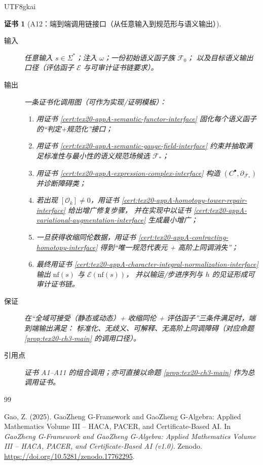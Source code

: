 \documentclass[12pt]{article}
\newtheorem{Certificate}{证书}[section]
\begin{document}
\begin{CJK*}{UTF8}{gkai}
\begin{Certificate}[A12：端到端调用链接口（从任意输入到规范形与语义输出）]
\label{cert:tex20-appA-endtoend-callgraph}
\begin{description}
  \item[输入] 任意输入 $s\in\Sigma^\ast$；注入 $\omega$；一份初始语义函子族 $\mathcal{F}_0$；
  以及目标语义输出口径（评估函子 $\mathcal{E}$ 与可审计证书链要求）。
  \item[输出] 一条证书化调用图（可作为实现/证明模板）：
  \begin{enumerate}
    \item 用证书 \ref{cert:tex20-appA-semantic-functor-interface} 固化每个语义函子的“判定+规范化”接口；
    \item 用证书 \ref{cert:tex20-appA-semantic-gauge-field-interface} 约束并抽取满足标准性与最小性的语义规范场候选 $\mathcal{F}_\ast$；
    \item 用证书 \ref{cert:tex20-appA-expression-complex-interface} 构造 $(C^\bullet,\partial_{\mathcal{F}_\ast})$ 并诊断障碍类；
    \item 若出现 $[\mathcal{O}_k]\neq 0$，用证书 \ref{cert:tex20-appA-homotopy-tower-repair-interface} 给出增广修复步骤，
    并在实现中以证书 \ref{cert:tex20-appA-variational-augmentation-interface} 生成最小增广；
    \item 一旦获得收缩同伦数据，用证书 \ref{cert:tex20-appA-contracting-homotopy-interface} 得到“唯一规范代表元 + 高阶上同调消失”；
    \item 最终用证书 \ref{cert:tex20-appA-character-integral-normalization-interface} 输出 $\mathrm{nf}(s)$ 与 $\mathcal{E}
      (\mathrm{nf}(s))$，
    并以输运/步进序列与 $h$ 的见证形成可审计证书链。
  \end{enumerate}
  \item[保证] 在“全域可接受（静态或动态）+ 收缩同伦 + 评估函子”三条件满足时，端到端输出满足：
  标准化、无歧义、可解释、无高阶上同调障碍（对应命题 \ref{prop:tex20-ch3-main} 的调用口径）。
  \item[引用点] 证书 A1--A11 的组合调用；亦可直接以命题 \ref{prop:tex20-ch3-main} 作为总调用证书。
\end{description}
\end{Certificate}

\begin{thebibliography}{99}

Gao, Z. (2025).
\newblock GaoZheng G-Framework and GaoZheng G-Algebra: Applied Mathematics Volume III – HACA, PACER, and
  Certificate-Based AI.
\newblock In \emph{GaoZheng G-Framework and GaoZheng G-Algebra: Applied Mathematics Volume III – HACA, PACER, and
  Certificate-Based AI (v1.0)}.
\newblock Zenodo.
\newblock \url{https://doi.org/10.5281/zenodo.17762295}.



\end{thebibliography}
\end{CJK*}
\end{document}
